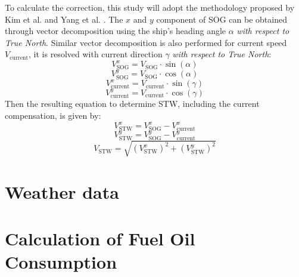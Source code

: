 To calculate the correction, this study will adopt the methodology proposed by Kim et al. \citep{Kim.2020b} and Yang et al. \citep{Yang.2020}. The $x$ and $y$ component of SOG can be obtained through vector decomposition using the ship's heading angle $\alpha$ \emph{with respect to True North}. Similar vector decomposition is also performed for current speed $V_{\text{current}}$, it is resolved with current direction $\gamma$ \emph{with respect to True North}:\\
\begin{equation}\label{eqn:sogx}
    V_{\text{SOG}}^x = V_{\text{SOG}}\cdot\sin(\alpha)   
\end{equation}
\begin{equation}\label{eqn:sogy}
    V_{\text{SOG}}^y = V_{\text{SOG}}\cdot\cos(\alpha)   
\end{equation} 
\begin{equation}\label{eqn:vcurrx}
     V_{\text{current}}^x = V_{\text{current}}\cdot\sin(\gamma)   
\end{equation}
\begin{equation}\label{eqn:vcurry}
    V_{\text{current}}^y = V_{\text{current}}\cdot\cos(\gamma)   
\end{equation}
Then the resulting equation to determine STW, including the current compensation, is given by:\\
\begin{equation}\label{eqn:stwx}
    V_{\text{STW}}^x = V_{\text{SOG}}^x - V_{\text{current}}^x    
\end{equation}
\begin{equation}\label{eqn:stwy}
    V_{\text{STW}}^y = V_{\text{SOG}}^y - V_{\text{current}}^y      
\end{equation}
\begin{equation}\label{eqn:stwabs}
    V_{\text{STW}} = \sqrt{(V_{\text{STW}}^x)^2 + (V_{\text{STW}}^y)^2} 
\end{equation}

\section{Weather data}\label{sec:weather_theo}

\section{Calculation of Fuel Oil Consumption}\label{sec:foc_calc}













